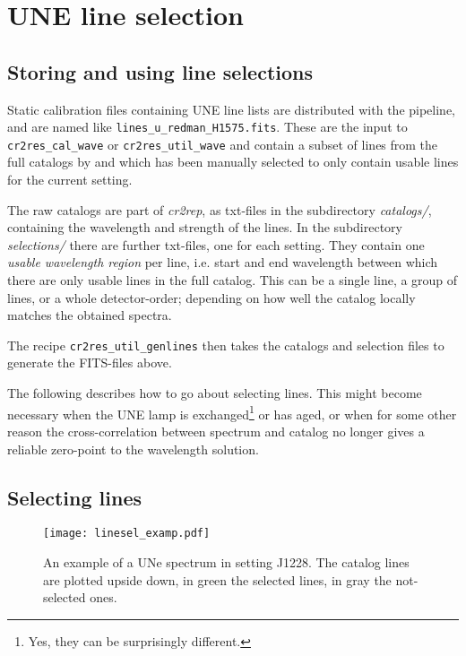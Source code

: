 \section{UNE line selection}
\label{sec:uneselect}

\subsection*{Storing and using line selections}

Static calibration files containing UNE line lists are distributed with the
pipeline, and are named like \linebreak \verb#lines_u_redman_H1575.fits#. These
are the input to \verb#cr2res_cal_wave# or \verb#cr2res_util_wave# and contain a
subset of lines from the full catalogs by \cite{2018A&A...618A.118S} and
\cite{2011ApJS..195...24R} which has been manually selected to only contain
usable lines for the current setting.

The raw catalogs are part of \emph{cr2rep}, as txt-files in the subdirectory
\emph{catalogs/}, containing the wavelength and strength of the lines. In the
subdirectory \emph{selections/} there are further txt-files, one for each
setting. They contain one \emph{usable wavelength region} per line, i.e. start
and end wavelength between which there are only usable lines in the full
catalog. This can be a single line, a group of lines, or a whole detector-order; depending on how well the catalog locally matches the obtained spectra.

The recipe \verb#cr2res_util_genlines# then takes the catalogs and selection files to generate the FITS-files above.

The following describes how to go about selecting lines. This might become necessary when the UNE lamp is exchanged\footnote{Yes, they can be surprisingly different.} or has aged, or when for some other reason the cross-correlation  between spectrum and catalog no longer gives a reliable zero-point to the wavelength solution.

\subsection*{Selecting lines}


\begin{figure}[ht]
    \begin{center}
\texttt{[image: linesel\_examp.pdf]}
\end{center}
\caption{An example of a UNe spectrum in setting J1228. The catalog lines are
 plotted upside down, in green the selected lines, in gray the not-selected
 ones. }
\label{fig:linesel}
\end{figure}


